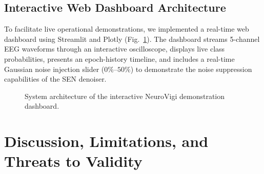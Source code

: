 \documentclass[conference]{IEEEtran}
\begin{document}
\subsection{Interactive Web Dashboard Architecture}
To facilitate live operational demonstrations, we implemented a real-time web dashboard using Streamlit and Plotly (Fig.~\ref{fig:dashboard_arch}). The dashboard streams 5-channel EEG waveforms through an interactive oscilloscope, displays live class probabilities, presents an epoch-history timeline, and includes a real-time Gaussian noise injection slider ($0\%\text{--}50\%$) to demonstrate the noise suppression capabilities of the SEN denoiser.

\begin{figure}[t]
\centering
{}
\caption{System architecture of the interactive NeuroVigi demonstration dashboard.}
\label{fig:dashboard_arch}
\end{figure}

\section{Discussion, Limitations, and Threats to Validity}
\label{sec:discussion}
\end{document}

